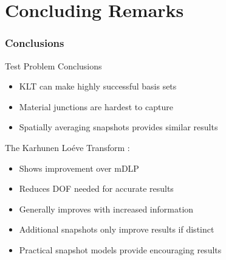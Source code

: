 \documentclass[fleqn]{beamer}
\begin{document}
        \section{Concluding Remarks}

        \begin{frame}
            \frametitle{Conclusions}
            \begin{block}{Test Problem Conclusions}
                \begin{itemize}
                    \item KLT can make highly successful basis sets
                    \item Material junctions are hardest to capture
                    \item Spatially averaging snapshots provides similar results
                \end{itemize}
            \end{block}
            \begin{block}{The Karhunen Lo\'{e}ve Transform :}
                \begin{itemize}
                    \item Shows improvement over mDLP
                    \item Reduces DOF needed for accurate results
                    \item Generally improves with increased information
                    \item Additional snapshots only improve results if distinct
                    \item Practical snapshot models provide encouraging results
                \end{itemize}
            \end{block}
        \end{frame}
\end{document}
